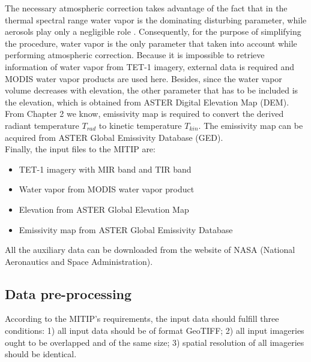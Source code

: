 \noindent The necessary atmospheric correction takes advantage of the fact that in the thermal spectral range water vapor is the dominating disturbing parameter, while aerosols play only a negligible role \parencite{Reference204}. Consequently, for the purpose of simplifying the procedure, water vapor is the only parameter that taken into account while performing atmospheric correction. Because it is impossible to retrieve information of water vapor from TET-1 imagery, external data is required and MODIS water vapor products are used here. Besides, since the water vapor volume decreases with elevation, the other parameter that has to be included is the elevation, which is obtained from ASTER Digital Elevation Map (DEM).\\

\noindent From Chapter 2 we know, emissivity map is required to convert the derived radiant temperature $T_{rad}$ to kinetic temperature $T_{kin}$. The emissivity map can be acquired from ASTER Global Emissivity Database (GED).\\

\noindent Finally, the input files to the MITIP are:
\begin{itemize}
\item TET-1 imagery with MIR band and TIR band
\item Water vapor from MODIS water vapor product
\item Elevation from ASTER Global Elevation Map
\item Emissivity map from ASTER Global Emissivity Database
\end{itemize}

\noindent All the auxiliary data can be downloaded from the website of NASA (National Aeronautics and Space Administration).\\


\subsection{Data pre-processing}
According to the MITIP's requirements, the input data should fulfill three conditions: 1) all input data should be of format GeoTIFF; 2) all input imageries ought to be overlapped and of the same size; 3) spatial resolution of all imageries should be identical.\\

